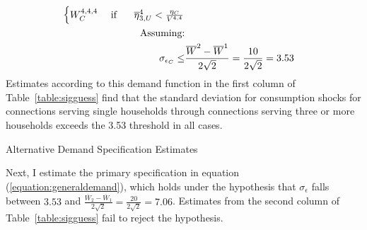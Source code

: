 \documentclass[12pt]{article}
\begin{document}
\begin{appendices}
\begin{align}
\begin{split}
\begin{cases}
W^{4,4,4}_C   & \text{ if } \hspace{.5cm} \overline{\eta}^{4}_{3,U} <    \frac{ \eta_C }{ V^{4,4} }   
\end{cases}\\
\text{Assuming:}\\
 \sigma_{\epsilon_C} \leq &\frac{  \overline{W}^{2} - \overline{W}^{1} }{ 2\sqrt{2} } = \frac{ 10 }{ 2 \sqrt{2} } = 3.53 
\end{split}
\end{align}
Estimates according to this demand function in the first column of Table~\ref{table:sigguess} find that the standard deviation for consumption shocks for connections serving single households through connections serving three or more households exceeds the 3.53 threshold in all cases.
\begin{table}
\centering
\caption{Alternative Demand Specification Estimates}\label{table:sigguess}

\end{table}
Next, I estimate the primary specification in equation (\ref{equation:generaldemand}), which holds under the hypothesis that $\sigma_{\epsilon}$ falls between $3.53$ and $\frac{\overline{W}_{2} - \overline{W}_1}{2\sqrt{2}} = \frac{20}{2\sqrt{2}} = 7.06$.  Estimates from the second column of Table~\ref{table:sigguess} fail to reject the hypothesis. 


\end{appendices}
\end{document}

